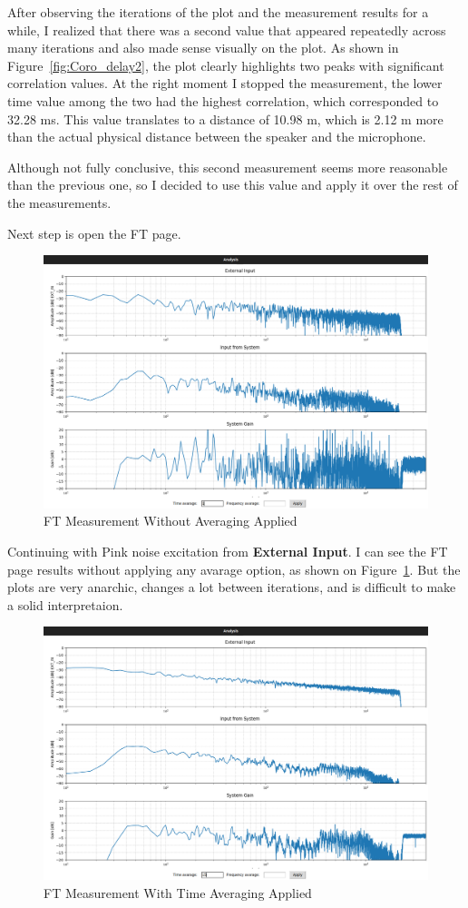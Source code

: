 After observing the iterations of the plot and the measurement results for a while, I realized that there was a second value that appeared repeatedly across many iterations and also made sense visually on the plot. As shown in Figure~\ref{fig:Coro_delay2}, the plot clearly highlights two peaks with significant correlation values. At the right moment I stopped the measurement, the lower time value among the two had the highest correlation, which corresponded to 32.28 ms. This value translates to a distance of 10.98 m, which is 2.12 m more than the actual physical distance between the speaker and the microphone.

Although not fully conclusive, this second measurement seems more reasonable than the previous one, so I decided to use this value and apply it over the rest of the measurements.

Next step is open the FT page.

\begin{figure}[H]
	\centering
	\includegraphics[width=0.8
	\linewidth]{Figures/Coro_FT_NO_av.png}
	\caption{FT Measurement Without Averaging Applied}
	\label{fig:Coro_FT_no_av}
\end{figure}

Continuing with Pink noise excitation from \textbf{External Input}. I can see the FT page results without applying any avarage option, as shown on Figure~\ref{fig:Coro_FT_no_av}. But the plots are very anarchic, changes a lot between iterations, and is difficult to make a solid interpretaion.

\begin{figure}[H]
	\centering
	\includegraphics[width=0.8
	\linewidth]{Figures/Coro_FT_time_av.png}
	\caption{FT Measurement With Time Averaging Applied}
	\label{fig:Coro_FT_time_av}
\end{figure}

